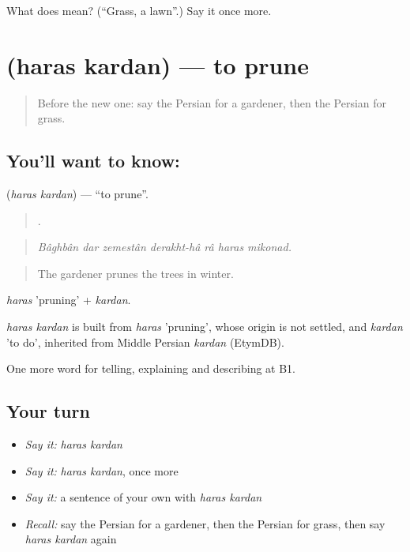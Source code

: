 \begin{tcolorbox}[breakable,colback=teal!4,colframe=teal!35!black,title={Before you move on}]
What does  mean? (\textquotedblleft{}Grass, a lawn\textquotedblright{}.) Say it once more.
\end{tcolorbox}
\section[\texorpdfstring{\fa{هرس} \fa{کردن} (haras kardan)}{هرس کردن (haras kardan)}]{  (haras kardan) — to prune}

\label{lesson:FA-C467-haras-kardan}



\begin{quote}
Before the new one: say the Persian for a gardener, then the Persian for grass.
\end{quote}

\subsection*{You'll want to know:  }
\textbf{ } (\emph{haras kardan}) — \textquotedblleft{}to prune\textquotedblright{}.

\begin{quote}
      .
\end{quote}

\begin{quote}
\emph{Bâghbân dar zemestân derakht-hâ râ haras mikonad.}
\end{quote}

\begin{quote}
The gardener prunes the trees in winter.
\end{quote}

\emph{haras} 'pruning' + \emph{kardan}.

\begin{cousinweb}
\emph{haras kardan} is built from \emph{haras} 'pruning', whose origin is not settled, and \emph{kardan} 'to do', inherited from Middle Persian \emph{kardan} (EtymDB).
\end{cousinweb}

\begin{grammarlens}[title={What you've built}]
One more word for telling, explaining and describing at B1.
\end{grammarlens}

\subsection*{Your turn}
\begin{itemize}
\raggedright
  \item \emph{Say it:} \emph{haras kardan}
  \item \emph{Say it:} \emph{haras kardan}, once more
  \item \emph{Say it:} a sentence of your own with \emph{haras kardan}
  \item \emph{Recall:} say the Persian for a gardener, then the Persian for grass, then say \emph{haras kardan} again
\end{itemize}

